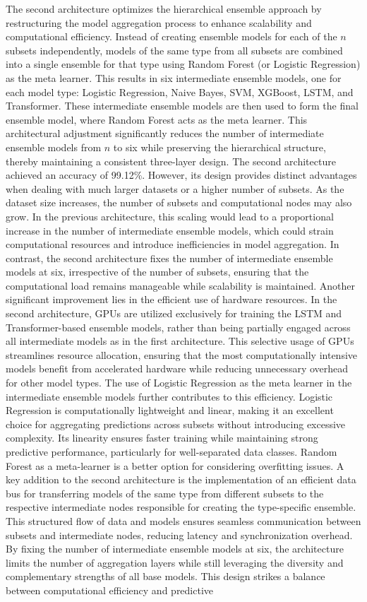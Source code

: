 \noindent
The second architecture optimizes the hierarchical ensemble approach by restructuring the model aggregation process to enhance scalability and computational efficiency. Instead of creating ensemble models for each of the $n$ subsets independently, models of the same type from all subsets are combined into a single ensemble for that type using Random Forest (or Logistic Regression) as the meta learner. This results in six intermediate ensemble models, one for each model type: Logistic Regression, Naive Bayes, SVM, XGBoost, LSTM, and Transformer. These intermediate ensemble models are then used to form the final ensemble model, where Random Forest acts as the meta learner. This architectural adjustment significantly reduces the number of intermediate ensemble models from $n$ to six while preserving the hierarchical structure, thereby maintaining a consistent three-layer design. The second architecture achieved an accuracy of 99.12\%. However, its design provides distinct advantages when dealing with much larger datasets or a higher number of subsets. As the dataset size increases, the number of subsets and computational nodes may also grow. In the previous architecture, this scaling would lead to a proportional increase in the number of intermediate ensemble models, which could strain computational resources and introduce inefficiencies in model aggregation. In contrast, the second architecture fixes the number of intermediate ensemble models at six, irrespective of the number of subsets, ensuring that the computational load remains manageable while scalability is maintained. Another significant improvement lies in the efficient use of hardware resources. In the second architecture, GPUs are utilized exclusively for training the LSTM and Transformer-based ensemble models, rather than being partially engaged across all intermediate models as in the first architecture. This selective usage of GPUs streamlines resource allocation, ensuring that the most computationally intensive models benefit from accelerated hardware while reducing unnecessary overhead for other model types. The use of Logistic Regression as the meta learner in the intermediate ensemble models further contributes to this efficiency. Logistic Regression is computationally lightweight and linear, making it an excellent choice for aggregating predictions across subsets without introducing excessive complexity. Its linearity ensures faster training while maintaining strong predictive performance, particularly for well-separated data classes. Random Forest as a meta-learner is a better option for considering overfitting issues. A key addition to the second architecture is the implementation of an efficient data bus for transferring models of the same type from different subsets to the respective intermediate nodes responsible for creating the type-specific ensemble. This structured flow of data and models ensures seamless communication between subsets and intermediate nodes, reducing latency and synchronization overhead. By fixing the number of intermediate ensemble models at six, the architecture limits the number of aggregation layers while still leveraging the diversity and complementary strengths of all base models. This design strikes a balance between computational efficiency and predictive 